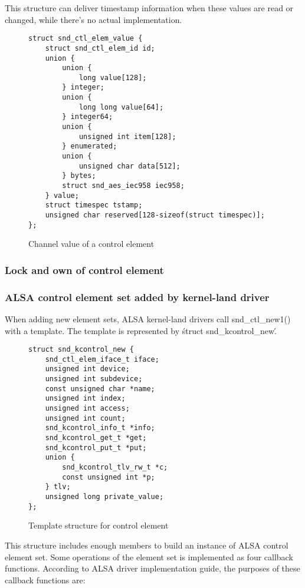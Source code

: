 \documentclass[onecolumn]{article}
\begin{document}
This structure can deliver timestamp information when these values are read or changed, while there's no actual implementation.

\begin{figure}[htbp]
\small
\begin{verbatim}
struct snd_ctl_elem_value {
    struct snd_ctl_elem_id id;
    union {
        union {
            long value[128];
        } integer;
        union {
            long long value[64];
        } integer64;
        union {
            unsigned int item[128];
        } enumerated;
        union {
            unsigned char data[512];
        } bytes;
        struct snd_aes_iec958 iec958;
    } value;
    struct timespec tstamp;
    unsigned char reserved[128-sizeof(struct timespec)];
};
\end{verbatim}
\caption{{Channel value of a control element }}
\label{fig:element-channel-value}
\end{figure}

\subsubsection{Lock and own of control element}



\subsubsection{ALSA control element set added by kernel-land driver}

When adding new element sets, ALSA kernel-land drivers call snd\_ctl\_new1() with a template. The template is represented by \'struct snd\_kcontrol\_new\'.

\begin{figure}[htbp]
\small
\begin{verbatim}
struct snd_kcontrol_new {
    snd_ctl_elem_iface_t iface;
    unsigned int device;
    unsigned int subdevice;
    const unsigned char *name;
    unsigned int index;
    unsigned int access;
    unsigned int count;
    snd_kcontrol_info_t *info;
    snd_kcontrol_get_t *get;
    snd_kcontrol_put_t *put;
    union {
        snd_kcontrol_tlv_rw_t *c;
        const unsigned int *p;
    } tlv;
    unsigned long private_value;
};
\end{verbatim}
\caption{{Template structure for control element}}
\label{control-element-template}
\end{figure}

This structure includes enough members to build an instance of ALSA control element set. Some operations of the element set is implemented as four callback functions. According to ALSA driver implementation guide\cite{alsa-driver}, the purposes of these callback functions are:
\end{document}
